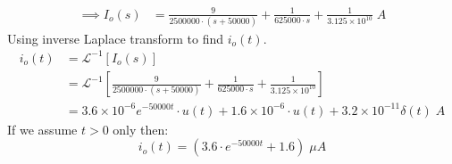 \begin{enumerate}
{		\begin{align*}
		\implies I_o(s) &= \frac{9}{2500000 \cdot(s+50000)} + \frac{1}{625000 \cdot s} 
		+ \frac{1}{3.125 \times 10^{10}} \; A
		\end{align*}
		Using inverse Laplace transform to find $i_o(t)$.
		\begin{align*}
		i_o(t) &= \mathcal{L}^{-1}\left[ I_o(s) \right]\\
		&= \mathcal{L}^{-1} \left[ \frac{9}{2500000 \cdot(s+50000)} 
		+ \frac{1}{625000 \cdot s} + \frac{1}{3.125 \times 10^{10}} \right]\\
		&= 3.6 \times 10^{-6} e^{-50000t} \cdot u(t) + 1.6 \times 10^{-6} \cdot u(t) + 3.2 \times 10^{-11} \delta(t) \; A
		\end{align*}
		If we assume $t>0$ only then:
		$$ i_o(t) = (3.6 \cdot e^{-50000t} + 1.6) \; \mu A $$
	}
\end{enumerate}